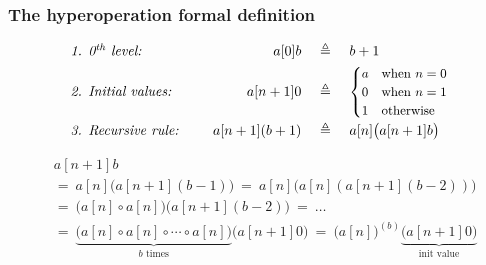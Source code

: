 \begin{frame}
\frametitle{The hyperoperation formal definition}
\begin{equation*}
\begin{array}{lrcl}
\textit{1. 0$^{\textit{th}}$ level: } & a[0]b & ~ \triangleq ~ & b + 1 \\[3pt]
\textit{2. Initial values: } & a[n+1]0 & ~ \triangleq ~ &
\small \begin{cases}
a & \text{when } n = 0 \\
0 & \text{when } n = 1 \\
1 & \text{otherwise}
\end{cases} \\[15pt]
\textit{3. Recursive rule: } \quad & a[n+1](b+1) & ~ \triangleq ~ & a[n]\big(a[n+1]b\big)
\end{array}
\end{equation*}

\begin{equation*}
\begin{aligned}
& a[n+1]b \\
& = ~ a[n]\big(a[n+1](b-1)\big) ~ = ~ a[n]\big(a[n](a[n+1](b-2))\big) \\
& = ~ \big(a[n]\circ a[n]\big)\big(a[n+1](b-2)\big) ~ = ~ \ldots \\
& = ~ \underbrace{\big( a[n]\circ a[n]\circ \cdots \circ a[n] \big)}_{b \text{ times}} \big(a[n+1]0\big)  ~ = ~ \big(a[n]\big)^{(b)}\underbrace{\big(a[n+1]0\big)}_{\text{init value}}
\end{aligned}
\end{equation*}

\end{frame}


